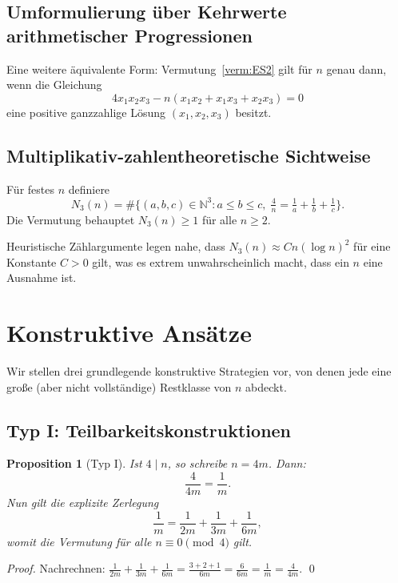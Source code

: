 \documentclass[12pt,a4paper]{amsart}
\newtheorem{proposition}[theorem]{Proposition}
\theoremstyle{definition}
\newcommand{\N}{\mathbb{N}}
\begin{document}
\subsection{Umformulierung über Kehrwerte arithmetischer Progressionen}

Eine weitere äquivalente Form: Vermutung~\ref{verm:ES2} gilt für $n$ genau
dann, wenn die Gleichung
\[
  4x_1 x_2 x_3 - n(x_1 x_2 + x_1 x_3 + x_2 x_3) = 0
\]
eine positive ganzzahlige Lösung $(x_1, x_2, x_3)$ besitzt.

\subsection{Multiplikativ-zahlentheoretische Sichtweise}

Für festes $n$ definiere
\[
  N_3(n) = \#\{(a,b,c) \in \N^3 : a \leq b \leq c,\;
            \tfrac{4}{n} = \tfrac{1}{a} + \tfrac{1}{b} + \tfrac{1}{c}\}.
\]
Die Vermutung behauptet $N_3(n) \geq 1$ für alle $n \geq 2$.

Heuristische Zählargumente legen nahe, dass
$N_3(n) \approx C n (\log n)^2$ für eine Konstante $C > 0$ gilt,
was es extrem unwahrscheinlich macht, dass ein $n$ eine Ausnahme ist.

\section{Konstruktive Ansätze}

Wir stellen drei grundlegende konstruktive Strategien vor, von denen jede
eine große (aber nicht vollständige) Restklasse von $n$ abdeckt.

\subsection{Typ I: Teilbarkeitskonstruktionen}

\begin{proposition}[Typ I]\label{prop:typI}
Ist $4 \mid n$, so schreibe $n = 4m$. Dann:
\[
  \frac{4}{4m} = \frac{1}{m}.
\]
Nun gilt die explizite Zerlegung
\[
  \frac{1}{m} = \frac{1}{2m} + \frac{1}{3m} + \frac{1}{6m},
\]
womit die Vermutung für alle $n \equiv 0 \pmod{4}$ gilt.
\end{proposition}

\begin{proof}
Nachrechnen: $\frac{1}{2m} + \frac{1}{3m} + \frac{1}{6m}
= \frac{3 + 2 + 1}{6m} = \frac{6}{6m} = \frac{1}{m} = \frac{4}{4m}$. \qed
\end{proof}
\end{document}
